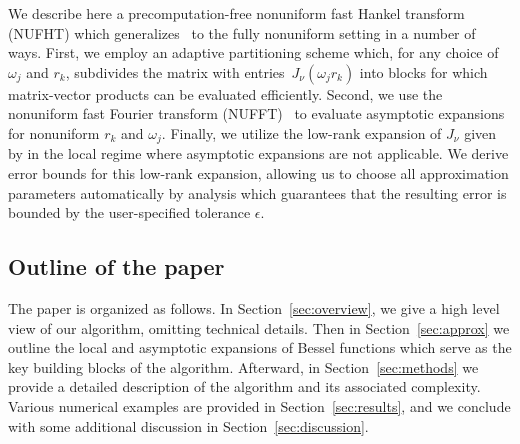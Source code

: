 We describe here a precomputation-free nonuniform fast Hankel transform (NUFHT)
which generalizes~\cite{townsend2015fast} to the fully nonuniform setting in a
number of ways. First, we employ an adaptive partitioning scheme which, for any
choice of $\omega_j$ and $r_k$, subdivides the matrix with
entries~$J_\nu(\omega_j r_k)$ into blocks for which matrix-vector products can
be evaluated efficiently. Second, we use the nonuniform fast Fourier transform
(NUFFT)~\cite{dutt1993fast, greengard2004accelerating} to evaluate asymptotic
expansions for nonuniform $r_k$ and $\omega_j$. Finally, we utilize the low-rank
expansion of $J_\nu$ given by \cite{wimp1962polynomial} in the local regime
where asymptotic expansions are not applicable. We derive error bounds for this
low-rank expansion, allowing us to choose all approximation parameters
automatically by analysis which guarantees that the resulting error is bounded
by the user-specified tolerance $\epsilon$.

\subsection*{Outline of the paper}

The paper is organized as follows. In Section~\ref{sec:overview}, we give a high
level view of our algorithm, omitting technical details. Then in
Section~\ref{sec:approx} we outline the local and asymptotic expansions of
Bessel functions which serve as the key building blocks of the algorithm.
Afterward, in Section~\ref{sec:methods} we provide a detailed description of the
algorithm and its associated complexity. Various numerical examples are provided
in Section~\ref{sec:results}, and we conclude with some additional discussion in
Section~\ref{sec:discussion}.


